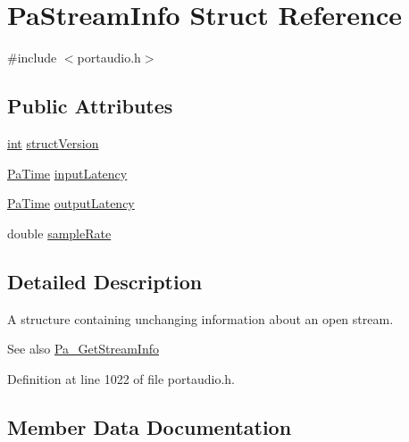 \hypertarget{struct_pa_stream_info}{}\section{Pa\+Stream\+Info Struct Reference}
\label{struct_pa_stream_info}


{\ttfamily \#include $<$portaudio.\+h$>$}

\subsection*{Public Attributes}
\begin{DoxyCompactItemize}
\item 
\hyperlink{xmltok_8h_a5a0d4a5641ce434f1d23533f2b2e6653}{int} \hyperlink{struct_pa_stream_info_a5e053a3f0f6232a5d1ec0dee0f9a943b}{struct\+Version}
\item 
\hyperlink{portaudio_8h_af17a7e6d0471a23071acf8dbd7bbe4bd}{Pa\+Time} \hyperlink{struct_pa_stream_info_a1f5339e0fef75cea66d9153235698399}{input\+Latency}
\item 
\hyperlink{portaudio_8h_af17a7e6d0471a23071acf8dbd7bbe4bd}{Pa\+Time} \hyperlink{struct_pa_stream_info_a372a81f39d90a85ae62225e9f57a7840}{output\+Latency}
\item 
double \hyperlink{struct_pa_stream_info_a9200fdee790d9155bc35d03be51ee2dd}{sample\+Rate}
\end{DoxyCompactItemize}


\subsection{Detailed Description}
A structure containing unchanging information about an open stream. \begin{DoxySeeAlso}{See also}
\hyperlink{pa__front_8c_a3d9c4cbda4e9f381b76f287c3de8a758}{Pa\+\_\+\+Get\+Stream\+Info} 
\end{DoxySeeAlso}


Definition at line 1022 of file portaudio.\+h.



\subsection{Member Data Documentation}
